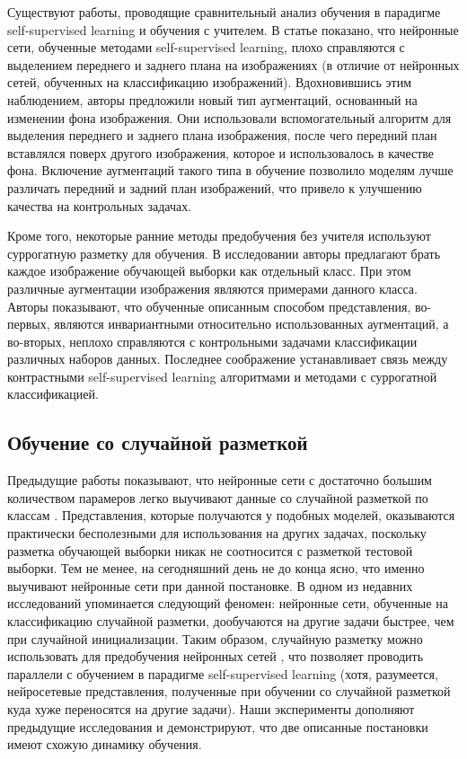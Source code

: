 Существуют работы, проводящие сравнительный анализ обучения в парадигме self-supervised learning и обучения с учителем. В статье \cite{dilo} показано, что нейронные сети, обученные методами self-supervised learning, плохо справляются с выделением переднего и заднего плана на изображениях (в отличие от нейронных сетей, обученных на классификацию изображений). Вдохновившись этим наблюдением, авторы предложили новый тип аугментаций, основанный на изменении фона изображения. Они использовали вспомогательный алгоритм для выделения переднего и заднего плана изображения, после чего передний план вставлялся поверх другого изображения, которое и использовалось в качестве фона. Включение аугментаций такого типа в обучение позволило моделям лучше различать передний и задний план изображений, что привело к улучшению качества на контрольных задачах.

Кроме того, некоторые ранние методы предобучения без учителя используют суррогатную разметку для обучения. В исследовании \cite{surrogate} авторы предлагают брать каждое изображение обучающей выборки как отдельный класс. При этом различные аугментации изображения являются примерами данного класса. Авторы показывают, что обученные описанным способом представления, во-первых, являются инвариантными относительно использованных аугментаций, а во-вторых, неплохо справляются с контрольными задачами классификации различных наборов данных. Последнее соображение устанавливает связь между контрастными self-supervised learning алгоритмами и методами с суррогатной классификацией.

\subsection{Обучение со случайной разметкой}

Предыдущие работы показывают, что нейронные сети с достаточно большим количеством парамеров легко выучивают данные со случайной разметкой по классам \cite{randlabels}. Представления, которые получаются у подобных моделей, оказываются практически бесполезными для использования на других задачах, поскольку разметка обучающей выборки никак не соотносится с разметкой тестовой выборки. Тем не менее, на сегодняшний день не до конца ясно, что именно выучивают нейронные сети при данной постановке. В одном из недавних исследований \cite{randlabels2} упоминается следующий феномен: нейронные сети, обученные на классификацию случайной разметки, дообучаются на другие задачи быстрее, чем при случайной инициализации. Таким образом, случайную разметку можно использовать для предобучения нейронных сетей \cite{randlabels3}, что позволяет проводить параллели с обучением в парадигме self-supervised learning (хотя, разумеется, нейросетевые представления, полученные при обучении со случайной разметкой куда хуже переносятся на другие задачи). Наши эксперименты дополняют предыдущие исследования и демонстрируют, что две описанные постановки имеют схожую динамику обучения.

